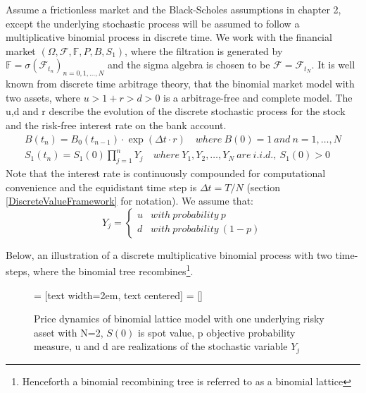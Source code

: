 Assume a frictionless market and the Black-Scholes assumptions in chapter 2, except the underlying stochastic process will be assumed to follow a multiplicative binomial process in discrete time. We work with the financial market $(\Omega, \mathcal{F}, \mathbb{F}, P, B, S_1)$, where the filtration is generated by $\mathbb{F}= \sigma(\mathcal{F}_{t_n})_{n=0,1,\ldots, N}$ and the sigma algebra is chosen to be $\mathcal{F}=\mathcal{F}_{t_{N}}$. It is well known from discrete time arbitrage theory, that the binomial market model with two assets, where $u>1+r>d>0$ is a arbitrage-free and complete model. The u,d and r describe the evolution of the discrete stochastic process for the stock and the risk-free interest rate on the bank account. 
\begin{align*}
B(t_n)=B_{0}(t_{n-1}) \cdot \exp(\Delta t \cdot r) \quad where \ B(0)=1 \ and \ n=1, \ldots, N\\
S_{1}(t_n)=S_{1}(0)\prod_{j=1}^{n} Y_{j} \quad where \ Y_1,Y_2, \ldots, Y_N \ are \ i.i.d., \ S_1(0)>0
\end{align*}
Note that the interest rate is continuously compounded for computational convenience and the equidistant time step is $\Delta t=T/N$ (section \ref{DiscreteValueFramework} for notation). We assume that: \[ Y_j = \begin{cases} 
      u & with \ probability \ p \\
      d & with \ probability \ (1-p)
   \end{cases}
\]

Below, an illustration of a discrete multiplicative binomial process with two time-steps, where the binomial tree recombines\footnote{Henceforth a binomial recombining tree is referred to as a binomial lattice}.\\

\begin{figure}[H]
\centering
 = [text width=2em, text centered]
 = []
\decoRule
\caption[Two Dimensional Binomial Lattice]{Price dynamics of binomial lattice model with one underlying risky asset with N=2, $S(0)$ is spot value, p objective probability measure, u and d are realizations of the stochastic variable $Y_j$}
\label{fig:twoDimLattice}
\end{figure}

